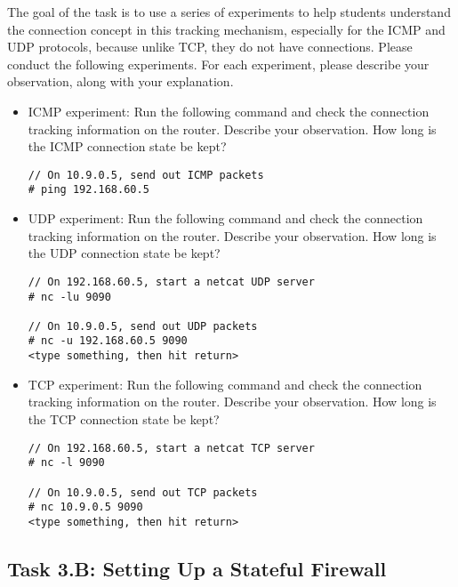 The goal of the task is to use a series of experiments to 
help students understand the 
connection concept in this tracking mechanism, especially
for the ICMP and UDP protocols, because unlike TCP,  they 
do not have connections. 
Please conduct the following experiments. For each experiment, please 
describe your observation, along with your explanation. 

\begin{itemize}
\item ICMP experiment: Run the following command and 
check the connection tracking information on the router. Describe
your observation. How long is the ICMP connection state be kept? 

\begin{lstlisting}
// On 10.9.0.5, send out ICMP packets
# ping 192.168.60.5
\end{lstlisting}

\item UDP experiment: Run the following command and 
check the connection tracking information on the router. Describe
your observation. How long is the UDP connection state be kept? 


\begin{lstlisting}
// On 192.168.60.5, start a netcat UDP server
# nc -lu 9090

// On 10.9.0.5, send out UDP packets  
# nc -u 192.168.60.5 9090
<type something, then hit return>
\end{lstlisting}


\item TCP experiment: Run the following command and 
check the connection tracking information on the router. Describe
your observation. How long is the TCP connection state be kept? 

\begin{lstlisting}
// On 192.168.60.5, start a netcat TCP server
# nc -l 9090

// On 10.9.0.5, send out TCP packets 
# nc 10.9.0.5 9090
<type something, then hit return>
\end{lstlisting}

\end{itemize}
 


\subsection{Task 3.B: Setting Up a Stateful Firewall} 


